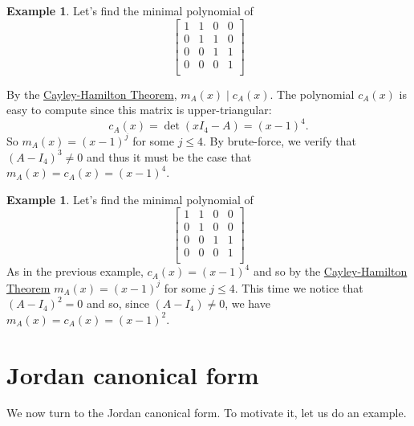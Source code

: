 \documentclass[12pt]{report}
\numberwithin{equation}{section}
\numberwithin{theorem}{chapter}
\theoremstyle{definition}
\newtheorem{example}[theorem]{Example}
\newtheorem*{basic properties}{Basic Properties}
\newtheorem*{Important Remark}{Important Remark}
\begin{document}
\begin{example} 
Let's find the minimal polynomial of 
$$
\begin{bmatrix}
1 & 1 & 0 & 0 \\
0 & 1 & 1 & 0 \\
0 &  0 & 1 & 1 \\
0 &  0 & 0 & 1 \\
\end{bmatrix}
$$

By the \hyperref[cayley-hamilton]{Cayley-Hamilton Theorem}, $m_A(x) \mid c_A(x)$. The polynomial $c_A(x)$ is easy to compute since this matrix is upper-triangular:
$$c_A(x) = \det(xI_4 - A) = (x-1)^4.$$ 
So $m_A(x) = (x-1)^j$ for some $j \leqslant 4$. By brute-force, we verify that $(A-I_4)^3 \neq 0$ and thus it must be the case that $m_A(x) = c_A(x) = (x-1)^4$. 
\end{example}

\begin{example} 
Let's find the minimal polynomial of 
$$\begin{bmatrix}
1 & 1 & 0 & 0 \\
0 & 1 & 0 & 0 \\
0 &  0 & 1 & 1 \\
0 &  0 & 0 & 1 \\
\end{bmatrix}$$
As in the previous example, $c_A(x) = (x-1)^4$ and so by the \hyperref[cayley-hamilton]{Cayley-Hamilton Theorem}
$m_A(x) = (x-1)^j$ for some $j \leqslant 4$. This time we notice that $(A-I_4)^2 = 0$ and so, since $(A-I_4) \neq 0$, we have $m_A(x) = c_A(x) = (x-1)^2$. 
\end{example}




\section{Jordan canonical form}

We now turn to the Jordan canonical form. To motivate it, let us do an example.
\end{document}
